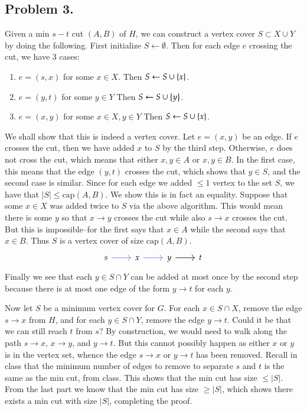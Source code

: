\documentclass[12pt]{article}
\theoremstyle{definitionstyle}
\newcommand{\SET}[1]{\Set{\mskip-\medmuskip #1 \mskip-\medmuskip}}
\begin{document}
    \subsection*{Problem 3.}
    Given a min $s-t$ cut $(A,B)$ of $H$, we can construct a vertex cover $S \subset X \cup Y$ by doing the following. First initialize $S \gets \emptyset$. Then for each edge $e$ crossing the cut, we have 3 cases:
    \begin{enumerate}
        \item $e = (s, x)$ for some $x \in X$. Then $S \gets S \cup \SET{x}$.
        \item $e = (y, t)$ for some $y \in Y$ Then $S \gets S \cup \SET{y}$.
        \item $e = (x, y)$ for some $x \in X, y \in Y$ Then $S \gets S \cup \SET{x}$.
    \end{enumerate}
    We shall show that this is indeed a vertex cover. Let $e = (x,y)$ be an edge. If $e$ crosses the cut, then we have added $x$ to $S$ by the third step. Otherwise, $e$ does not cross the cut, which means that either $x,y \in A$ or $x,y \in B$. In the first case, this means that the edge $(y,t)$ crosses the cut, which shows that $y \in S$, and the second case is similar. Since for each edge we added $\leq 1$ vertex to the set $S$, we have that $|S| \leq \mathrm{cap}(A,B)$. We show this is in fact an equality. Suppose that some $x \in X$ was added twice to $S$ via the above algorithm. This would mean there is some $y$ so that $x \to y$ crosses the cut while also $s \to x$ crosses the cut. But this is impossible--for the first says that $x \in A$ while the second says that $x \in B$. Thus $S$ is a vertex cover of size $\mathrm{cap}(A,B)$.
    \[\begin{tikzcd}
        s & x & y & t
        \arrow[color={rgb,255:red,153;green,92;blue,214}, from=1-1, to=1-2]
        \arrow[color={rgb,255:red,153;green,92;blue,214}, from=1-2, to=1-3]
        \arrow[from=1-3, to=1-4]
    \end{tikzcd}\]
    Finally we see that each $y \in S \cap Y$ can be added at most once by the second step because there is at most one edge of the form $y \to t$ for each $y$. 

    Now let $S$ be a minimum vertex cover for $G$. For each $x \in S \cap X$, remove the edge $s \to x$ from $H$, and for each $y \in S \cap Y$, remove the edge $y \to t$. Could it be that we can still reach $t$ from $s$? By construction, we would need to walk along the path $s \to x$, $x \to y$, and $y \to t$. But this cannot possibly happen as either $x$ or $y$ is in the vertex set, whence the edge $s \to x$ or $y \to t$ has been removed. Recall in class that the minimum number of edges to remove to separate $s$ and $t$ is the same as the min cut, from class. This shows that the min cut has size $\leq |S|$. From the last part we know that the min cut has size $\geq |S|$, which shows there exists a min cut with size $|S|$, completing the proof.
\end{document}
